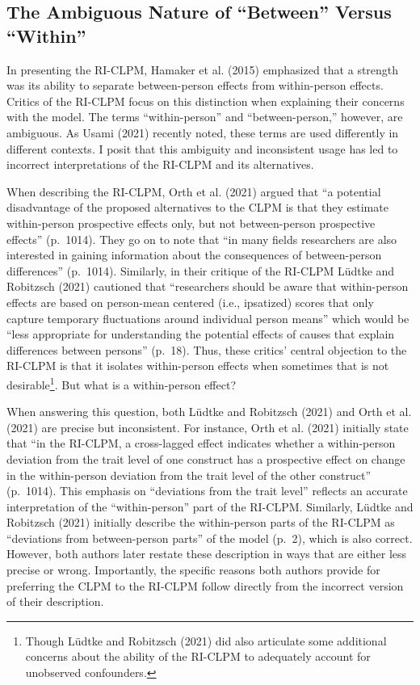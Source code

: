\documentclass[
  english,
  man,floatsintext]{apa6}
\begin{document}
\hypertarget{the-ambiguous-nature-of-between-versus-within}{%
\subsection{The Ambiguous Nature of ``Between'' Versus ``Within''}\label{the-ambiguous-nature-of-between-versus-within}}

In presenting the RI-CLPM, Hamaker et al. (2015) emphasized that a strength was its ability to separate between-person effects from within-person effects. Critics of the RI-CLPM focus on this distinction when explaining their concerns with the model. The terms ``within-person'' and ``between-person,'' however, are ambiguous. As Usami (2021) recently noted, these terms are used differently in different contexts. I posit that this ambiguity and inconsistent usage has led to incorrect interpretations of the RI-CLPM and its alternatives.

When describing the RI-CLPM, Orth et al. (2021) argued that ``a potential disadvantage of the proposed alternatives to the CLPM is that they estimate within-person prospective effects only, but not between-person prospective effects'' (p.~1014). They go on to note that ``in many fields researchers are also interested in gaining information about the consequences of between-person differences'' (p.~1014). Similarly, in their critique of the RI-CLPM Lüdtke and Robitzsch (2021) cautioned that ``researchers should be aware that within-person effects are based on person-mean centered (i.e., ipsatized) scores that only capture temporary fluctuations around individual person means'' which would be ``less appropriate for understanding the potential effects of causes that explain differences between persons'' (p.~18). Thus, these critics' central objection to the RI-CLPM is that it isolates within-person effects when sometimes that is not desirable\footnote{Though Lüdtke and Robitzsch (2021) did also articulate some additional concerns about the ability of the RI-CLPM to adequately account for unobserved confounders.}. But what is a within-person effect?

When answering this question, both Lüdtke and Robitzsch (2021) and Orth et al. (2021) are precise but inconsistent. For instance, Orth et al. (2021) initially state that ``in the RI-CLPM, a cross-lagged effect indicates whether a within-person deviation from the trait level of one construct has a prospective effect on change in the within-person deviation from the trait level of the other construct'' (p.~1014). This emphasis on ``deviations from the trait level'' reflects an accurate interpretation of the ``within-person'' part of the RI-CLPM. Similarly, Lüdtke and Robitzsch (2021) initially describe the within-person parts of the RI-CLPM as ``deviations from between-person parts'' of the model (p.~2), which is also correct. However, both authors later restate these description in ways that are either less precise or wrong. Importantly, the specific reasons both authors provide for preferring the CLPM to the RI-CLPM follow directly from the incorrect version of their description.
\end{document}
